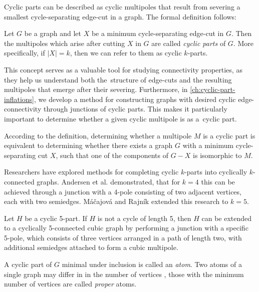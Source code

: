\documentclass[12pt, twoside]{book}
\begin{document}
Cyclic parts can be described as cyclic multipoles that result from severing a smallest cycle-separating edge-cut in a graph. The formal definition follows:

\begin{definition}
	Let $G$ be a graph and let $X$ be a minimum cycle-separating edge-cut in $G$. Then the multipoles which arise after cutting $X$ in $G$ are called \textit{cyclic parts} of $G$. More specifically, if $|X|=k$, then we can refer to them as cyclic $k$-parts.
\end{definition}

This concept serves as a valuable tool for studying connectivity properties, as they help us understand both the~structure of edge-cuts and the resulting multipoles that emerge after their severing. Furthermore, in \cref{ch:cyclic-part-inflations},  we develop a method for constructing graphs with desired cyclic \mbox{edge-connectivity} through junctions of cyclic parts. This makes it particularly important to determine whether a given cyclic multipole is as a~cyclic part.

According to the definition, determining whether a multipole $M$ is a cyclic part is equivalent to determining whether there exists a graph $G$ with a minimum cycle-separating cut $X$, such that one of the components of $G-X$ is isomorphic to $M$.

Researchers have explored methods for completing cyclic $k$-parts into cyclically $k$-connected graphs. Andersen et al. \cite{Andersen1988} demonstrated, that for $k=4$ this can be achieved through a junction with a 4-pole consisting of two adjacent vertices, each with two semiedges. Máčajová and Rajník \cite{Macajova2022} extended this research to $k=5$.

\begin{theorem}
	Let $H$ be a cyclic 5-part. If $H$ is not a cycle of length 5, then $H$ can be extended to a cyclically 5-connected cubic graph by performing a junction with a specific 5-pole, which consists of three vertices arranged in a path of length two, with additional semiedges attached to form a cubic multipole.
\end{theorem}

A cyclic part of $G$ minimal under inclusion is called an \textit{atom}. Two atoms of a single graph may differ in in the number of vertices \cite{atoms-of-cyclic}, those with the minimum number of vertices are called \textit{proper} atoms.
\end{document}
